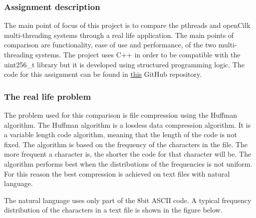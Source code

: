 \subsubsection{Assignment description}
The main point of focus of this project is to compare the pthreads and openCilk multi-threading systems through a real life application.
The main points of comparison are functionality, ease of use and performance, of the two multi-threading systems. The project uses C++ in
order to be compatible with the uint256\_t library but it is developed using structured programming logic. The code for this assignment 
can be found in \href{https://github.com/Billkyriaf/pds_assignment_4}{this} GitHub repository.

\subsubsection{The real life problem}
The problem used for this comparison is file compression using the Huffman algorithm. The Huffman algorithm is a lossless data compression algorithm. 
It is a variable length code algorithm, meaning that the length of the code is not fixed. The algorithm is based on the frequency of the characters in
the file. The more frequent a character is, the shorter the code for that character will be. The algorithm performs best when the distributions of the 
frequencies is not uniform. For this reason the best compression is achieved on text files with natural language. 

The natural language uses only part of the 8bit ASCII code. A typical frequency distribution of the characters in a text file is shown in the figure below.

